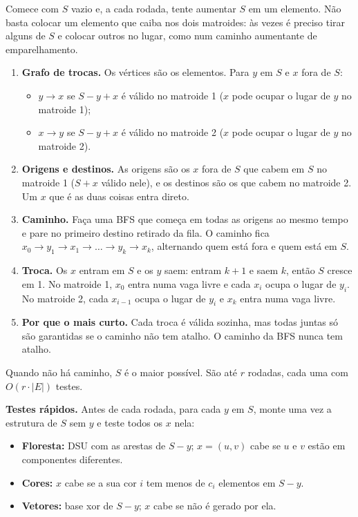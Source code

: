 Comece com $S$ vazio e, a cada rodada, tente aumentar $S$ em um elemento. Não basta colocar um elemento que caiba
nos dois matroides: às vezes é preciso tirar alguns de $S$ e colocar outros no lugar, como num caminho aumentante
de emparelhamento.
\begin{enumerate}
  \item \textbf{Grafo de trocas.} Os vértices são os elementos. Para $y$ em $S$ e $x$ fora de $S$:
        \begin{itemize}
          \item $y \to x$ se $S - y + x$ é válido no matroide 1 ($x$ pode ocupar o lugar de $y$ no matroide 1);
          \item $x \to y$ se $S - y + x$ é válido no matroide 2 ($x$ pode ocupar o lugar de $y$ no matroide 2).
        \end{itemize}
  \item \textbf{Origens e destinos.} As origens são os $x$ fora de $S$ que cabem em $S$ no matroide 1
        ($S + x$ válido nele), e os destinos são os que cabem no matroide 2. Um $x$ que é as duas coisas entra
        direto.
  \item \textbf{Caminho.} Faça uma BFS que começa em todas as origens ao mesmo tempo e pare no primeiro destino
        retirado da fila. O caminho fica $x_0 \to y_1 \to x_1 \to \dots \to y_k \to x_k$, alternando quem está fora e
        quem está em $S$.
  \item \textbf{Troca.} Os $x$ entram em $S$ e os $y$ saem: entram $k + 1$ e saem $k$, então $S$ cresce em 1.
        No matroide 1, $x_0$ entra numa vaga livre e cada $x_i$ ocupa o lugar de $y_i$. No matroide 2, cada $x_{i-1}$
        ocupa o lugar de $y_i$ e $x_k$ entra numa vaga livre.
  \item \textbf{Por que o mais curto.} Cada troca é válida sozinha, mas todas juntas só são garantidas se o caminho
        não tem atalho. O caminho da BFS nunca tem atalho.
\end{enumerate}
Quando não há caminho, $S$ é o maior possível. São até $r$ rodadas, cada uma com $O(r \cdot |E|)$ testes.

\textbf{Testes rápidos.} Antes de cada rodada, para cada $y$ em $S$, monte uma vez a estrutura de $S$ sem $y$ e teste
todos os $x$ nela:
\begin{itemize}
  \item \textbf{Floresta:} DSU com as arestas de $S - y$; $x = (u, v)$ cabe se $u$ e $v$ estão em componentes
        diferentes.
  \item \textbf{Cores:} $x$ cabe se a sua cor $i$ tem menos de $c_i$ elementos em $S - y$.
  \item \textbf{Vetores:} base xor de $S - y$; $x$ cabe se não é gerado por ela.
\end{itemize}

